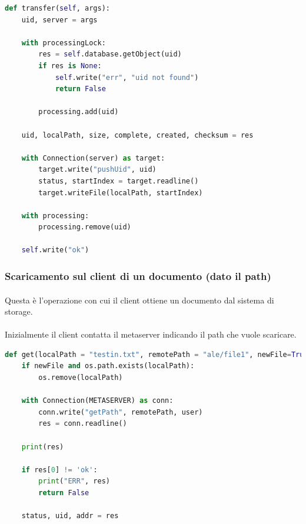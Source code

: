 \documentclass{article}
\begin{document}
\begin{lstlisting}[language=Python, title=Dataserver sorgente]
def transfer(self, args):
    uid, server = args

    with processingLock:
        res = self.database.getObject(uid)
        if res is None:
            self.write("err", "uid not found")
            return False

        processing.add(uid)

    uid, localPath, size, complete, created, checksum = res

    with Connection(server) as target:
        target.write("pushUid", uid)
        status, startIndex = target.readline()
        target.writeFile(localPath, startIndex)

    with processing:
        processing.remove(uid)

    self.write("ok")
\end{lstlisting}



\subsubsection{Scaricamento sul client di un documento (dato il path)}

\paragraph{} Questa è l'operazione con cui il client ottiene un documento dal sistema di storage.

\paragraph{} Inizialmente il client contatta il metaserver indicando il path che vuole scaricare.

\begin{lstlisting}[language=Python, title=Client]
def get(localPath = "testin.txt", remotePath = "ale/file1", newFile=True, user="default"):
    if newFile and os.path.exists(localPath):
        os.remove(localPath)

    with Connection(METASERVER) as conn:
        conn.write("getPath", remotePath, user)
        res = conn.readline()

    print(res)

    if res[0] != 'ok':
        print("ERR", res)
        return False

    status, uid, addr = res
\end{lstlisting}
\end{document}
